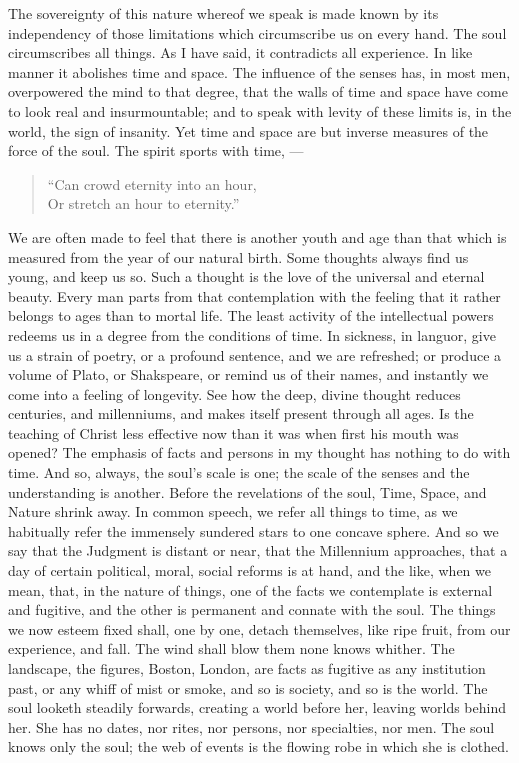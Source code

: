 \documentclass{article}
\begin{document}
The sovereignty of this nature whereof we speak is made known by its independency of those limitations which circumscribe us on every hand. The soul circumscribes all things. As I have said, it contradicts all experience. In like manner it abolishes time and space. The influence of the senses has, in most men, overpowered the mind to that degree, that the walls of time and space have come to look real and insurmountable; and to speak with levity of these limits is, in the world, the sign of insanity. Yet time and space are but inverse measures of the force of the soul. The spirit sports with time, ---
\begin{verse}
    ``Can crowd eternity into an hour,\\
    Or stretch an hour to eternity.''
\end{verse}
We are often made to feel that there is another youth and age than that which is measured from the year of our natural birth. Some thoughts always find us young, and keep us so. Such a thought is the love of the universal and eternal beauty. Every man parts from that contemplation with the feeling that it rather belongs to ages than to mortal life. The least activity of the intellectual powers redeems us in a degree from the conditions of time. In sickness, in languor, give us a strain of poetry, or a profound sentence, and we are refreshed; or produce a volume of Plato, or Shakspeare, or remind us of their names, and instantly we come into a feeling of longevity. See how the deep, divine thought reduces centuries, and millenniums, and makes itself present through all ages. Is the teaching of Christ less effective now than it was when first his mouth was opened? The emphasis of facts and persons in my thought has nothing to do with time. And so, always, the soul's scale is one; the scale of the senses and the understanding is another. Before the revelations of the soul, Time, Space, and Nature shrink away. In common speech, we refer all things to time, as we habitually refer the immensely sundered stars to one concave sphere. And so we say that the Judgment is distant or near, that the Millennium approaches, that a day of certain political, moral, social reforms is at hand, and the like, when we mean, that, in the nature of things, one of the facts we contemplate is external and fugitive, and the other is permanent and connate with the soul. The things we now esteem fixed shall, one by one, detach themselves, like ripe fruit, from our experience, and fall. The wind shall blow them none knows whither. The landscape, the figures, Boston, London, are facts as fugitive as any institution past, or any whiff of mist or smoke, and so is society, and so is the world. The soul looketh steadily forwards, creating a world before her, leaving worlds behind her. She has no dates, nor rites, nor persons, nor specialties, nor men. The soul knows only the soul; the web of events is the flowing robe in which she is clothed.
\end{document}
